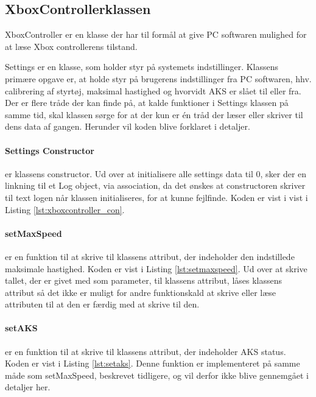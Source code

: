 \subsection{XboxControllerklassen} \label{sec:xboxcontroller_impl}

XboxController er en klasse der har til formål at give PC softwaren mulighed for at læse Xbox controllerens tilstand.

Settings er en klasse, som holder styr på systemets indstillinger. Klassens primære opgave er, at holde styr på brugerens indstillinger fra PC softwaren, hhv. calibrering af styrtøj, maksimal hastighed og hvorvidt AKS er slået til eller fra.
Der er flere tråde der kan finde på, at kalde funktioner i Settings klassen på samme tid, skal klassen sørge for at der kun er én tråd der læser eller skriver til dens data af gangen.
Herunder vil koden blive forklaret i detaljer.


\paragraph{Settings Constructor} er klassens constructor. Ud over at initialisere alle settings data til 0, sker der en linkning til et Log object, via association, da det ønskes at constructoren skriver til text logen når klassen initialiseres, for at kunne fejlfinde. Koden er vist i vist i Listing \ref{lst:xboxcontroller_con}.




\paragraph{setMaxSpeed} er en funktion til at skrive til klassens attribut, der indeholder den indstillede maksimale hastighed. Koden er vist i Listing \ref{lst:setmaxspeed}. Ud over at skrive tallet, der er givet med som parameter, til klassens attribut, låses klassens attribut så det ikke er muligt for andre funktionskald at skrive eller læse attributen til at den er færdig med at skrive til den. 




\paragraph{setAKS} er en funktion til at skrive til klassens attribut, der indeholder AKS status. Koden er vist i Listing \ref{lst:setaks}. Denne funktion er implementeret på samme måde som setMaxSpeed, beskrevet tidligere, og vil derfor ikke blive gennemgået i detaljer her.

